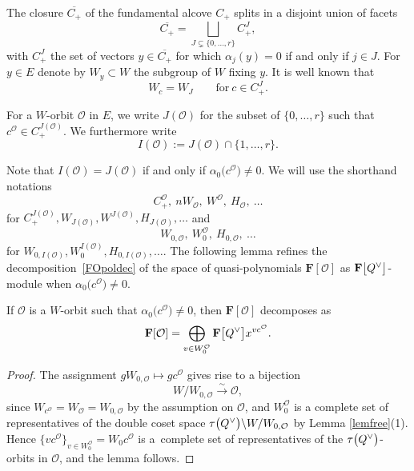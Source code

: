 The closure $\overline{C_+}$ of the fundamental alcove $C_+$ splits in a disjoint union of facets
\begin{equation*}%
\overline{C_+}=\bigsqcup_{J\subsetneq \{0,\dots,r\}}C_+^J,
\end{equation*}
with $C_+^J$ the set of vectors $y\in\overline{C_+}$ for which $\alpha_j(y)=0$ if and only if $j\in J$.
For $y\in E$ denote by $W_y\subset W$ the subgroup of $W$ fixing $y$. It is well known that
\[
W_c=W_J\qquad \text{for}\ c\in C_+^J.
\]

\begin{Definition}\label{IJ}
For a $W$-orbit $\mathcal{O}$ in $E$, we write
$J(\mathcal{O})$ for the subset of $\{0,\dots,r\}$ such that $c^\mathcal{O}\in C_+^{J(\mathcal{O})}$. We furthermore write
\begin{equation*}%
I(\mathcal{O}):=J(\mathcal{O})\cap\{1,\dots,r\}.
\end{equation*}
\end{Definition}

Note that $I(\mathcal{O})=J(\mathcal{O})$ if and only if $\alpha_0\bigl(c^\mathcal{O}\bigr)\not=0$.
We will use the shorthand notations
\[
C_+^\mathcal{O},\ nW_\mathcal{O},\ W^\mathcal{O},\ H_\mathcal{O}, \ \dots
\]
for $C_+^{J(\mathcal{O})},W_{J(\mathcal{O})}, W^{J(\mathcal{O})}, H_{J(\mathcal{O})},\dots$ and
\[
W_{0,\mathcal{O}},\ W^{\mathcal{O}}_0,\ H_{0,\mathcal{O}},\ \dots
\]
for $W_{0,I(\mathcal{O})}, W_0^{I(\mathcal{O})}, H_{0,I(\mathcal{O})},\dots$.
The following lemma refines the decomposition~\eqref{FOpoldec} of the space of quasi-polynomials $\mathbf{F}[\mathcal{O}]$ as $\mathbf{F}\smash{\bigl[Q^\vee\bigr]}$-module when
$\alpha_0\bigl(c^\mathcal{O}\bigr)\not=0$.
\begin{Lemma}\label{Pcpoldec}
If $\mathcal{O}$ is a $W$-orbit such that $\alpha_0\bigl(c^\mathcal{O}\bigr)\not=0$, then
$\mathbf{F}[\mathcal{O}]$ decomposes as
\begin{equation}\label{FpoldecI}
\mathbf{F}[\mathcal{O}]=\bigoplus_{v\in W_0^\mathcal{O}}\mathbf{F}\smash{\bigl[Q^\vee\bigr]}x^{vc^\mathcal{O}}.
\end{equation}
\end{Lemma}
\begin{proof}
The assignment $gW_{0,\mathcal{O}}\mapsto gc^\mathcal{O}$ gives rise to a bijection
\[
W/W_{0,\mathcal{O}}\overset{\sim}{\longrightarrow}\mathcal{O},
\]
since $W_{c^\mathcal{O}}=W_{\mathcal{O}}=W_{0,\mathcal{O}}$ by the assumption on $\mathcal{O}$, and $W_0^{\mathcal{O}}$ is a complete set of representatives of the double coset space $\tau\smash{\bigl(Q^\vee\bigr)}\backslash W/W_{0,\mathcal{O}}$ by Lemma
\ref{lemfree}(1).
Hence $\{vc^\mathcal{O}\}_{v\in W_0^{\mathcal{O}}}=W_0c^\mathcal{O}$ is a~complete set of representatives of the $\tau\smash{\bigl(Q^\vee\bigr)}$-orbits in $\mathcal{O}$, and the lemma follows.
\end{proof}

